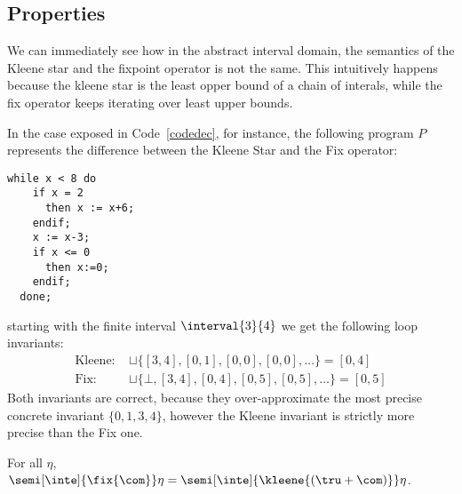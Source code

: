 \subsection{Properties}
\label{sub:intervalsprop}

We can immediately see how in the abstract interval domain, the
semantics of the Kleene star and the fixpoint operator is not the
same. This intuitively happens because the kleene star is the least
opper bound of a chain of interals, while the fix operator keeps
iterating over least upper bounds.

\begin{example} \label{ex:fix} In the case exposed in
  Code~\ref{codedec}, for instance, the following program \(P\)
  represents the difference between the Kleene Star and the Fix
  operator:
  \begin{lstlisting}[caption=\(\fix{\com}\) and \(\com^*\) difference, label=codedec, language=Imp]
  while x < 8 do
    if x = 2
      then x := x+6;
    endif;
    x := x-3;
    if x <= 0
      then x:=0;
    endif;
  done;\end{lstlisting}
  starting with the finite interval \(\interval{3}{4}\) we get the
  following loop invariants:
  \begin{align*}
    \text{Kleene: } &\sqcup\{[3,4], [0,1], [0,0], [0,0], \ldots\} = [0,4]\\
    \text{Fix: } & \sqcup\{\bot, [3,4], [0,4], [0,5], [0,5],\ldots\} = [0,5]
  \end{align*}
  \noindent
  Both invariants are correct, because they over-approximate the most
  precise concrete invariant \(\{0,1,3,4\}\), however the Kleene
  invariant is strictly more precise than the Fix one.
\end{example}

\begin{lemma}\label{le:sugar}
  For all \(\eta\),
  \(\semi[\inte]{\fix{\com}} \eta = \semi[\inte]{\kleene{(\tru + \com)}} \eta\).
\end{lemma}

